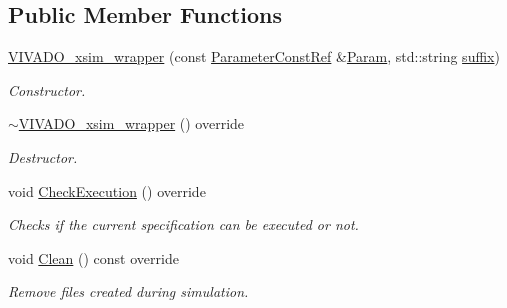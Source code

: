 \subsection*{Public Member Functions}
\begin{DoxyCompactItemize}
\item 
\hyperlink{classVIVADO__xsim__wrapper_a9f6e3b67622e26c6fd19d315bab1f7c4}{V\+I\+V\+A\+D\+O\+\_\+xsim\+\_\+wrapper} (const \hyperlink{Parameter_8hpp_a37841774a6fcb479b597fdf8955eb4ea}{Parameter\+Const\+Ref} \&\hyperlink{classSimulationTool_adc409fd8f18901e2d0ea4a6ab6690138}{Param}, std\+::string \hyperlink{classVIVADO__xsim__wrapper_a2a60246f92c8468a49b075003d453508}{suffix})
\begin{DoxyCompactList}\small\item\em Constructor. \end{DoxyCompactList}\item 
\hyperlink{classVIVADO__xsim__wrapper_ab6df03864d1f9c31337dde08212c3149}{$\sim$\+V\+I\+V\+A\+D\+O\+\_\+xsim\+\_\+wrapper} () override
\begin{DoxyCompactList}\small\item\em Destructor. \end{DoxyCompactList}\item 
void \hyperlink{classVIVADO__xsim__wrapper_a92bc3d2006fc9eea8741aae4856e0d75}{Check\+Execution} () override
\begin{DoxyCompactList}\small\item\em Checks if the current specification can be executed or not. \end{DoxyCompactList}\item 
void \hyperlink{classVIVADO__xsim__wrapper_ad24840f9dda8644309661c912f37c150}{Clean} () const override
\begin{DoxyCompactList}\small\item\em Remove files created during simulation. \end{DoxyCompactList}\end{DoxyCompactItemize}
